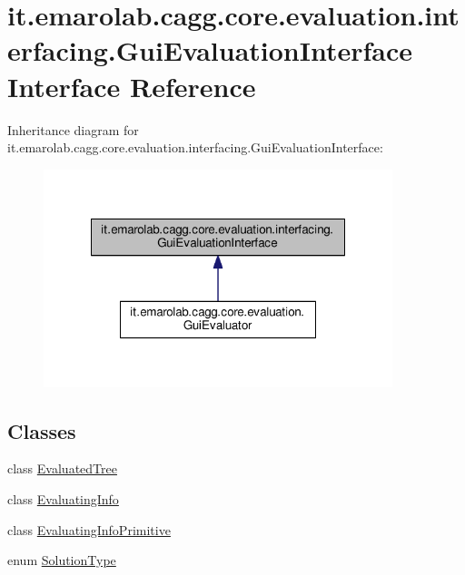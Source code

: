 \hypertarget{interfaceit_1_1emarolab_1_1cagg_1_1core_1_1evaluation_1_1interfacing_1_1GuiEvaluationInterface}{\section{it.\-emarolab.\-cagg.\-core.\-evaluation.\-interfacing.\-Gui\-Evaluation\-Interface Interface Reference}
\label{interfaceit_1_1emarolab_1_1cagg_1_1core_1_1evaluation_1_1interfacing_1_1GuiEvaluationInterface}
}


Inheritance diagram for it.\-emarolab.\-cagg.\-core.\-evaluation.\-interfacing.\-Gui\-Evaluation\-Interface\-:\nopagebreak
\begin{figure}[H]
\begin{center}
\leavevmode
\includegraphics[width=288pt]{interfaceit_1_1emarolab_1_1cagg_1_1core_1_1evaluation_1_1interfacing_1_1GuiEvaluationInterface__inherit__graph}
\end{center}
\end{figure}
\subsection*{Classes}
\begin{DoxyCompactItemize}
\item 
class \hyperlink{classit_1_1emarolab_1_1cagg_1_1core_1_1evaluation_1_1interfacing_1_1GuiEvaluationInterface_1_1EvaluatedTree}{Evaluated\-Tree}
\item 
class \hyperlink{classit_1_1emarolab_1_1cagg_1_1core_1_1evaluation_1_1interfacing_1_1GuiEvaluationInterface_1_1EvaluatingInfo}{Evaluating\-Info}
\item 
class \hyperlink{classit_1_1emarolab_1_1cagg_1_1core_1_1evaluation_1_1interfacing_1_1GuiEvaluationInterface_1_1EvaluatingInfoPrimitive}{Evaluating\-Info\-Primitive}
\item 
enum \hyperlink{enumit_1_1emarolab_1_1cagg_1_1core_1_1evaluation_1_1interfacing_1_1GuiEvaluationInterface_1_1SolutionType}{Solution\-Type}
\end{DoxyCompactItemize}
